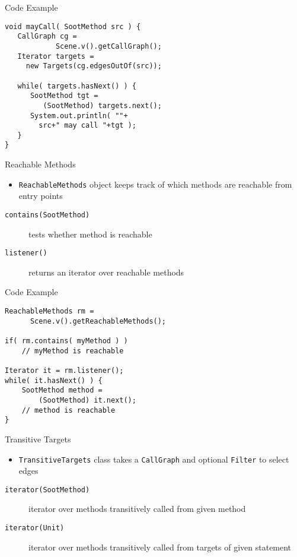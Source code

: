 \begin{slide}{Code Example}
\vspace*{-5mm}
\begin{verbatim}
void mayCall( SootMethod src ) {
   CallGraph cg =
            Scene.v().getCallGraph();
   Iterator targets =
     new Targets(cg.edgesOutOf(src));

   while( targets.hasNext() ) {
      SootMethod tgt =
         (SootMethod) targets.next();
      System.out.println( ""+
        src+" may call "+tgt );
   }
}
\end{verbatim}
\end{slide}

\begin{slide}{Reachable Methods}
\begin{itemize}
\item \texttt{ReachableMethods} object keeps track of which methods are
reachable from entry points
\end{itemize}
\begin{description}
\item [\texttt{contains(SootMethod)}] tests whether method is reachable
\item [\texttt{listener()}] returns an iterator over reachable methods
\end{description}
\end{slide}

\begin{slide}{Code Example}
\begin{verbatim}
ReachableMethods rm =
      Scene.v().getReachableMethods();

if( rm.contains( myMethod ) ) 
    // myMethod is reachable

Iterator it = rm.listener();
while( it.hasNext() ) {
    SootMethod method = 
        (SootMethod) it.next();
    // method is reachable
}
\end{verbatim}
\end{slide}

\begin{slide}{Transitive Targets}
\begin{itemize}
\item {\tt TransitiveTargets} class takes a {\tt CallGraph} and
optional {\tt Filter} to select edges
\end{itemize}
\begin{description}
\item [\texttt{iterator(SootMethod)}] iterator over methods transitively
called from given method
\item [\texttt{iterator(Unit)}] iterator over methods transitively
called from targets of given statement
\end{description}
\end{slide}

